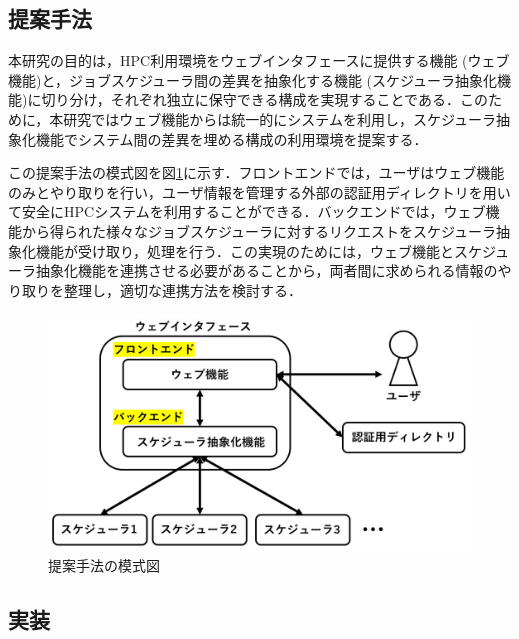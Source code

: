\subsection{提案手法}
本研究の目的は，HPC利用環境をウェブインタフェースに提供する機能 (ウェブ機能)と，ジョブスケジューラ間の差異を抽象化する機能 (スケジューラ抽象化機能)に切り分け，それぞれ独立に保守できる構成を実現することである．このために，本研究ではウェブ機能からは統一的にシステムを利用し，スケジューラ抽象化機能でシステム間の差異を埋める構成の利用環境を提案する．\par
この提案手法の模式図を図\ref{fig6}に示す．フロントエンドでは，ユーザはウェブ機能のみとやり取りを行い，ユーザ情報を管理する外部の認証用ディレクトリを用いて安全にHPCシステムを利用することができる．バックエンドでは，ウェブ機能から得られた様々なジョブスケジューラに対するリクエストをスケジューラ抽象化機能が受け取り，処理を行う．この実現のためには，ウェブ機能とスケジューラ抽象化機能を連携させる必要があることから，両者間に求められる情報のやり取りを整理し，適切な連携方法を検討する．\par

\begin{figure}[tb]
    \centering
    \includegraphics[width=120mm]{./fig/proposed_method.png}
    \caption{提案手法の模式図}
    \label{fig6}
\end{figure}

\subsection{実装}

